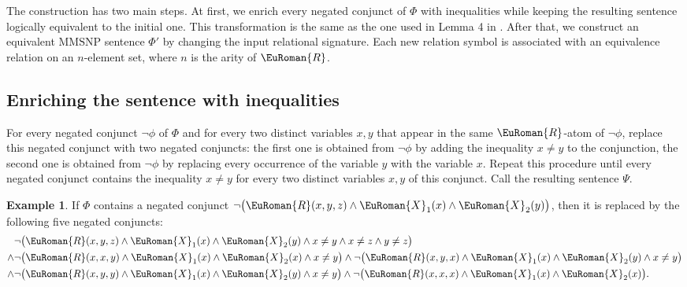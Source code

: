 \documentclass[10pt,a4paper]{amsart}
\theoremstyle{plain}
\theoremstyle{definition}
\newtheorem{exa}[thm]{Example}
\numberwithin{equation}{section}
\newcommand{\eurm}[1]{\EuRoman{#1}} %
\newcommand{\rel}[1]{\eurm{#1}} %
\newcommand{\MMSNP}[0]{\textrm{MMSNP}}
\begin{document}
The construction has two main steps.
%
At first, we enrich every negated conjunct of $\Phi$ with inequalities while keeping the resulting sentence logically equivalent to the initial one.
%
This transformation is the same as the one used in Lemma 4 in \cite{federV03}.
%
After that, we construct an equivalent $\MMSNP$ sentence $\Phi'$ by changing the input relational signature.
%
Each new relation symbol is associated with an equivalence relation on an $n$-element set, where $n$ is the arity of $\rel{R}$.

\subsection*{Enriching the sentence with inequalities} 
For every negated conjunct $\neg\phi$ of  $\Phi$ and for every two distinct variables $x,y$ that appear in the same $\rel{R}$-atom of $\neg\phi$,  replace this negated conjunct with two negated conjuncts: the first one is obtained from $\neg\phi$ by adding the inequality $x\not=y$ to the conjunction, the second one is obtained from $\neg\phi$ by replacing every occurrence of the variable $y$ with the variable $x$.
%
Repeat this procedure until every negated conjunct contains the inequality $x\not=y$ for every two distinct variables $x,y$ of this conjunct. Call the resulting sentence $\Psi$.

\begin{exa} \label{example:enriching_inequalities}
If $\Phi$ contains a negated conjunct $\neg\bigl(\rel{R}(x,y,z)\wedge\rel{X}_1(x)\wedge\rel{X}_2(y)\bigr)$, then it is replaced by the following five negated conjuncts: 
\begin{align*}
&\neg\bigl(\rel{R}(x,y,z)\wedge\rel{X}_1(x)\wedge\rel{X}_2(y)\wedge x\not=y \wedge x\not=z\wedge y\not=z\bigr)\\
\wedge &\neg\bigl(\rel{R}(x,x,y)\wedge\rel{X}_1(x)\wedge\rel{X}_2(x)\wedge x\not=y\bigr)\wedge \neg\bigl(\rel{R}(x,y,x)\wedge\rel{X}_1(x)\wedge\rel{X}_2(y)\wedge x\not=y\bigr)\\
\wedge &\neg\bigl(\rel{R}(x,y,y)\wedge\rel{X}_1(x)\wedge\rel{X}_2(y)\wedge x\not=y\bigr)\wedge \neg\bigl(\rel{R}(x,x,x)\wedge\rel{X}_1(x)\wedge\rel{X}_2(x)\bigr).
\end{align*}
\end{exa}
\end{document}
